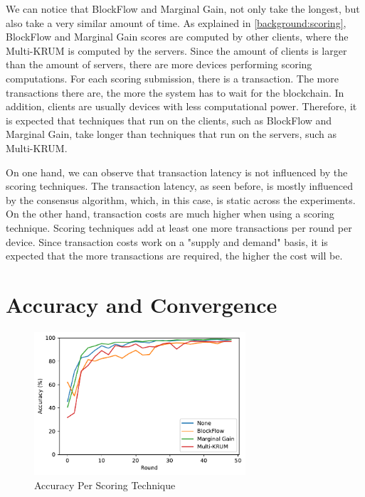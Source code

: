 We can notice that BlockFlow and Marginal Gain, not only take the longest, but also take a very similar amount of time. As explained in \autoref{background:scoring}, BlockFlow and Marginal Gain scores are computed by other clients, where the Multi-KRUM is computed by the servers. Since the amount of clients is larger than the amount of servers, there are more devices performing scoring computations. For each scoring submission, there is a transaction. The more transactions there are, the more the system has to wait for the blockchain. In addition, clients are usually devices with less computational power. Therefore, it is expected that techniques that run on the clients, such as BlockFlow and Marginal Gain, take longer than techniques that run on the servers, such as Multi-KRUM.

On one hand, we can observe that transaction latency is not influenced by the scoring techniques. The transaction latency, as seen before, is mostly influenced by the consensus algorithm, which, in this case, is static across the experiments. On the other hand, transaction costs are much higher when using a scoring technique. Scoring techniques add at least one more transactions per round per device. Since transaction costs work on a "supply and demand" basis, it is expected that the more transactions are required, the higher the cost will be.

\section{Accuracy and Convergence}

\begin{figure}[!ht]
    \centering
    \centering
    \includegraphics[width=0.7\textwidth]{graphics/scoring/accuracy.pdf}
    \caption{Accuracy Per Scoring Technique}
    \label{fig:accuracy_scoring}
\end{figure}


